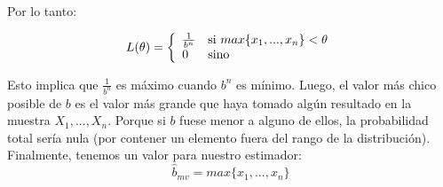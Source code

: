 Por lo tanto:

\begin{center}
\begin{displaymath}
L(\theta) = \left\{
\begin{array}{l l}
			\frac{1}{b^n} & \text{si }max\{x_{1}, ..., x_{n}\} < \theta\\
			0 & \text{sino}
\end{array}
\right.
\end{displaymath}
\end{center}

Esto implica que $\frac{1}{b^n}$ es máximo cuando $b^n$ es mínimo. Luego, el valor más chico posible de $b$ es el valor más grande que haya tomado algún resultado en la muestra $X_{1}, ..., X_{n}$. Porque si $b$ fuese menor a alguno de ellos, la probabilidad total sería nula (por contener un elemento fuera del rango de la distribución). Finalmente, tenemos un valor para nuestro estimador:
$$\hat{b}_{mv} = max\{x_{1}, ..., x_{n}\}$$